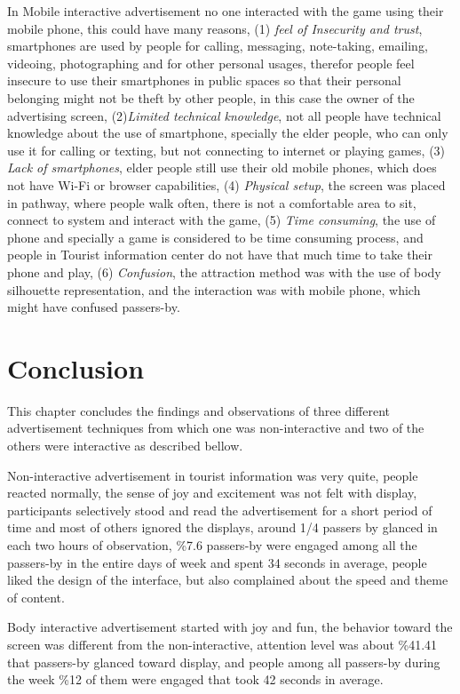 In Mobile interactive advertisement no one interacted with the game using their mobile phone, this could have many reasons, (1) \emph{feel of Insecurity and trust}, smartphones are used by people for calling, messaging, note-taking, emailing, videoing, photographing and for other personal usages, therefor people feel insecure to use their smartphones in public spaces so that their personal belonging might not be theft by other people, in this case the owner of the advertising screen, (2)\emph{Limited technical knowledge}, not all people have technical knowledge about the use of smartphone, specially the elder people, who can only use it for calling or texting, but not connecting to internet or playing games, (3) \emph{Lack of smartphones}, elder people still use their old mobile phones, which does not have Wi-Fi or browser capabilities, (4) \emph{Physical setup}, the screen was placed in pathway, where people walk often, there is not a comfortable area to sit, connect to system and interact with the game, (5) \emph{Time consuming}, the use of phone and specially a game is considered to be time consuming process, and people in Tourist information center do not have that much time to take their phone and play, (6) \emph{Confusion}, the attraction method was with the use of body silhouette representation, and the interaction was with mobile phone, which might have confused passers-by. 


\section{Conclusion}
This chapter concludes the findings and observations of three different advertisement techniques from which one was non-interactive and two of the others were interactive as described bellow.

Non-interactive advertisement in tourist information was very quite, people reacted normally, the sense of joy and excitement was not felt with display, participants selectively stood and read the advertisement for a short period of time and most of others ignored the displays, around 1/4 passers by glanced in each two hours of observation, \%7.6 passers-by were engaged among all the passers-by in the entire days of week and spent 34 seconds in average, people liked the design of the interface, but also complained about the speed and theme of content.

Body interactive advertisement started with joy and fun, the behavior toward the screen was different from the non-interactive, attention level was about \%41.41 that passers-by glanced toward display, and people among all passers-by during the week \%12 of them were engaged that took 42 seconds in average.

